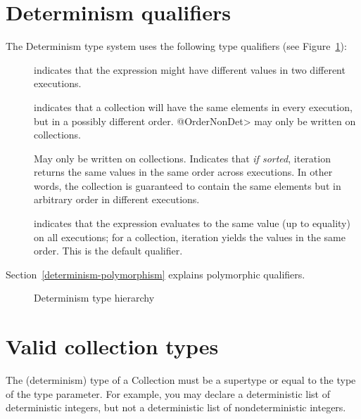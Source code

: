 \section{Determinism qualifiers\label{determinism-qualifiers}}

The Determinism type system uses the following type qualifiers (see Figure~\ref{fig-determinism-hierarchy}):
\begin{description}
\item[] indicates
  that the expression might have different values in two different executions.
\item[] indicates that
  a collection will have the same elements in every execution, but in a
  possibly different order.  \<@OrderNonDet> may only be written on
  collections.
\item[] May only be written on
collections. Indicates that \textit{if sorted}, iteration returns the same values in the
same order across executions. In other words, the collection is guaranteed to
contain the same elements but in arbitrary order in different executions.
\item[] indicates that
  the expression evaluates to the same value (up to equality) on all
  executions; for a collection, iteration yields the values in the same
  order.
  This is the default qualifier.
\end{description}

Section~\ref{determinism-polymorphism} explains polymorphic qualifiers.

\begin{figure}
  \begin{center}
  \end{center}
\caption{Determinism type hierarchy}
\label{fig-determinism-hierarchy}
\end{figure}


\section{Valid collection types\label{determinism-collection-types}}

The (determinism) type of a Collection must be a supertype or equal to
the type of the type parameter.  For example, you may declare a
deterministic list of deterministic integers, but not a deterministic
list of nondeterministic integers.

